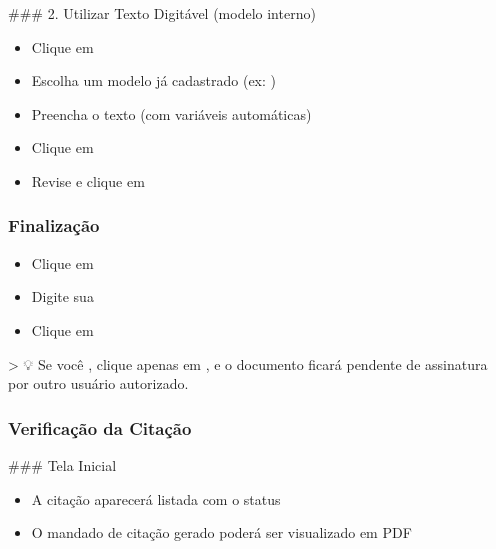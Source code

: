 \documentclass[letterpaper,10pt,brazil]{sphinxmanual}
\begin{document}
\sphinxAtStartPar
\#\#\# 2. Utilizar Texto Digitável (modelo interno)
\begin{itemize}
\item {} 
\sphinxAtStartPar
Clique em 

\item {} 
\sphinxAtStartPar
Escolha um modelo já cadastrado (ex: )

\item {} 
\sphinxAtStartPar
Preencha o texto (com variáveis automáticas)

\item {} 
\sphinxAtStartPar
Clique em 

\item {} 
\sphinxAtStartPar
Revise e clique em 

\end{itemize}


\subsubsection{Finalização}
\label{\detokenize{projud_30_cita_xe7_xe3oeletronica:finalizacao}}\begin{itemize}
\item {} 
\sphinxAtStartPar
Clique em 

\item {} 
\sphinxAtStartPar
Digite sua 

\item {} 
\sphinxAtStartPar
Clique em 

\end{itemize}

\sphinxAtStartPar
\textgreater{} 💡 Se você , clique apenas em , e o documento ficará pendente de assinatura por outro usuário autorizado.


\subsubsection{Verificação da Citação}
\label{\detokenize{projud_30_cita_xe7_xe3oeletronica:verificacao-da-citacao}}
\sphinxAtStartPar
\#\#\# Tela Inicial
\begin{itemize}
\item {} 
\sphinxAtStartPar
A citação aparecerá listada com o status 

\item {} 
\sphinxAtStartPar
O mandado de citação gerado poderá ser visualizado em PDF

\end{itemize}
\end{document}
